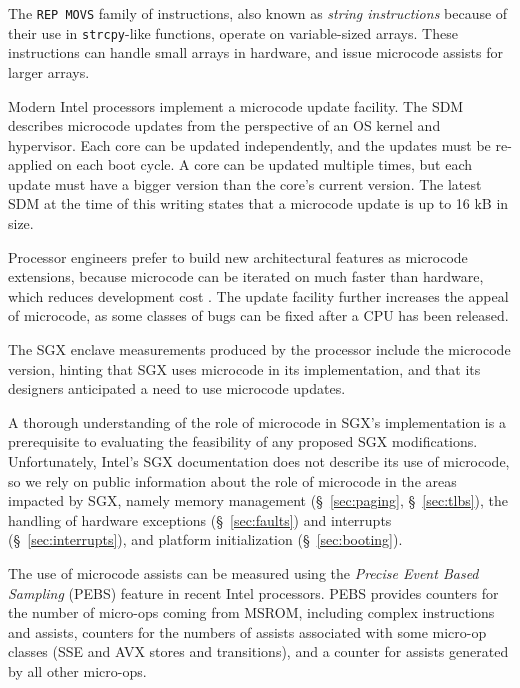 The \texttt{REP MOVS} family of instructions, also known as \textit{string
instructions} because of their use in \texttt{strcpy}-like functions, operate
on variable-sized arrays. These instructions can handle small arrays in
hardware, and issue microcode assists for larger arrays.


Modern Intel processors implement a microcode update facility. The SDM
describes microcode updates from the perspective of an OS kernel and
hypervisor. Each core can be updated independently, and the updates must be
re-applied on each boot cycle. A core can be updated multiple times, but each
update must have a bigger version than the core's current version. The latest
SDM at the time of this writing states that a microcode update is up to 16 kB
in size.

Processor engineers prefer to build new architectural features as microcode
extensions, because microcode can be iterated on much faster than hardware,
which reduces development cost \cite{intel2008genetic, intel2012clusters}. The
update facility further increases the appeal of microcode, as some classes of
bugs can be fixed after a CPU has been released.

The SGX enclave measurements produced by the processor include the microcode
version, hinting that SGX uses microcode in its implementation, and that its
designers anticipated a need to use microcode updates.

A thorough understanding of the role of microcode in SGX's implementation is
a prerequisite to evaluating the feasibility of any proposed SGX modifications.
Unfortunately, Intel's SGX documentation does not describe its use of
microcode, so we rely on public information about the role of microcode in the
areas impacted by SGX, namely memory management (\S~\ref{sec:paging},
\S~\ref{sec:tlbs}), the handling of hardware exceptions
(\S~\ref{sec:faults}) and interrupts (\S~\ref{sec:interrupts}), and
platform initialization (\S~\ref{sec:booting}).


The use of microcode assists can be measured using the
\textit{Precise Event Based Sampling} (PEBS) feature in recent Intel
processors. PEBS provides counters for the number of micro-ops coming from
MSROM, including complex instructions and assists, counters for the numbers of
assists associated with some micro-op classes (SSE and AVX stores and
transitions), and a counter for assists generated by all other micro-ops.

